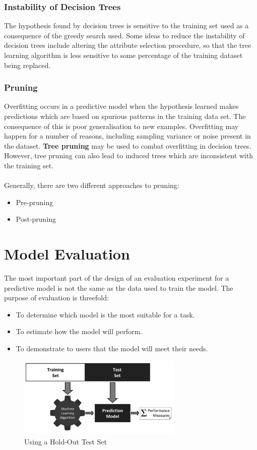 \documentclass[a4paper,11pt]{article}
\begin{document}
\subsubsection{Instability of Decision Trees}
The hypothesis found by decision trees is sensitive to the training set used as a consequence of the greedy search used.
Some ideas to reduce the instability of decision trees include altering the attribute selection procedure, so that the tree learning algorithm is less sensitive to some percentage of the training dataset being replaced.

\subsubsection{Pruning}
Overfitting occurs in a predictive model when the hypothesis learned makes predictions which are based on spurious patterns in the training data set.
The consequence of this is poor generalisation to new examples.
Overfitting may happen for a number of reasons, including sampling variance or noise present in the dataset.
\textbf{Tree pruning} may be used to combat overfitting in decision trees.
However, tree pruning can also lead to induced trees which are inconsistent with the training set.
\\\\
Generally, there are two different approaches to pruning:
\begin{itemize}
    \item   Pre-pruning
    \item   Post-pruning
\end{itemize}

\section{Model Evaluation}
The most important part of the design of an evaluation experiment for a predictive model is not the same as the data used to train the model.
The purpose of evaluation is threefold:
\begin{itemize}
    \item   To determine which model is the most suitable for a task.
    \item   To estimate how the model will perform.
    \item   To demonstrate to users that the model will meet their needs. 
\end{itemize}

\begin{figure}[H]
    \centering
    \includegraphics[width=0.7\textwidth]{images/holdouttestset.png}
    \caption{Using a Hold-Out Test Set}
\end{figure}
\end{document}
